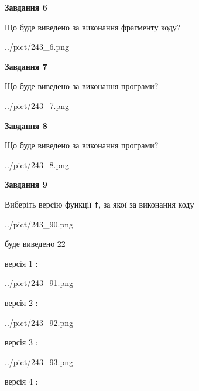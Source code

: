 \documentclass[12pt, ukrainian]{article}
\def\code#1{\Verb!#1!}
\begin{document}
{\begin {large}
{\begin {center}\textbf{Завдання 6}\end {center}}

Що буде виведено за виконання фрагменту коду?\par
\begin{center}
	{../pict/243_6.png}
\end{center}
\newpage

{\begin {center}\textbf{Завдання 7}\end {center}}

Що буде виведено за виконання програми?\par
\begin{center}
	{../pict/243_7.png}
\end{center}
\newpage

{\begin {center}\textbf{Завдання 8}\end {center}}

Що буде виведено за виконання програми?\par
\begin{center}
	{../pict/243_8.png}
\end{center}
\newpage

{\begin {center}\textbf{Завдання 9}\end {center}}

Виберіть версію функції \code{f}, за якої за виконання коду
\begin{center}
	{../pict/243_90.png}
\end{center}
буде виведено 22

\vspace{5mm}
версія 1 :

\begin{center}
	{../pict/243_91.png}
\end{center}
версія 2 :

\begin{center}
	{../pict/243_92.png}
\end{center}
версія 3 :

\begin{center}
	{../pict/243_93.png}
\end{center}
версія 4 :


\end{large}}
\end{document}
